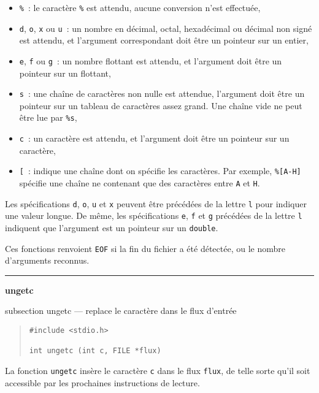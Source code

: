 \documentclass [twoside] {report}
\newcommand {\primitive} [1]
    {
	\phantomsection
	{\large \bf #1}
	\addcontentsline {toc} {subsection} {#1}
    }
\newcommand {\separation}
    {
	\vspace {5mm}
	\nopagebreak
	\hrule
    }
\begin{document}
\begin {itemize}
    \item {\tt \%}~: le caractère {\tt \%} est attendu, aucune conversion
	n'est effectuée, \par
    \item {\tt d}, {\tt o}, {\tt x} ou {\tt u}~: un nombre en décimal, octal,
	hexadécimal ou décimal non signé est attendu, et l'argument
	correspondant doit être un pointeur sur un entier, \par
    \item {\tt e}, {\tt f} ou {\tt g}~: un nombre flottant est attendu, et
	l'argument doit être un pointeur sur un flottant, \par
    \item {\tt s}~: une chaîne de caractères non nulle est attendue,
	l'argument doit être un pointeur sur un tableau de
	caractères assez grand. Une chaîne vide ne peut être lue par
	{\tt \%s}, \par
    \item {\tt c}~: un caractère est attendu, et l'argument doit être
	un pointeur sur un caractère, \par
    \item {\tt [}~: indique une chaîne dont on spécifie les
	caractères. Par exemple, {\tt \%[A-H]} spécifie une chaîne ne
	contenant que des caractères entre {\tt A} et {\tt H}.
\end {itemize}

Les spécifications {\tt d}, {\tt o}, {\tt u} et {\tt x} peuvent être
précédées de la lettre {\tt l} pour indiquer une valeur longue.
De même, les spécifications {\tt e}, {\tt f} et {\tt g} précédées
de la lettre {\tt l} indiquent que l'argument est un pointeur
sur un {\tt double}.

Ces fonctions renvoient {\tt EOF} si la fin du fichier a été
détectée, ou le nombre d'arguments reconnus.



\separation
\primitive {ungetc} --- replace le caractère dans le flux d'entrée

\begin {quote}
\begin {verbatim}
#include <stdio.h>

int ungetc (int c, FILE *flux)
\end{verbatim}
\end {quote}

La fonction {\tt ungetc} insère le caractère {\tt c} dans le
flux {\tt flux}, de telle sorte qu'il soit accessible par les
prochaines instructions de lecture.
\end{document}

